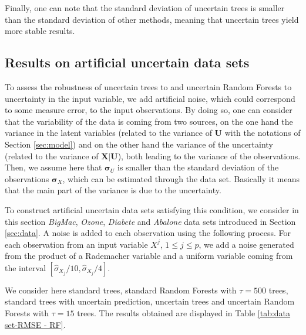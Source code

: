 Finally, one can note that the standard deviation of uncertain trees is smaller than the standard deviation of other methods, meaning that uncertain trees yield more stable results.

\subsection{Results on artificial uncertain data sets}
\label{sec:arti}
To assess the robustness of uncertain trees to and uncertain Random Forests to uncertainty in the input variable, we add artificial noise, which could correspond to some measure error, to the input observations.
By doing so, one can consider that the variability of the data is coming from two sources, on the one hand the variance in the latent variables (related to the variance of $\mathbf{U}$ with the notations of Section \ref{sec:model}) and on the other hand the variance of the uncertainty (related to the variance of $\mathbf{X} | \mathbf{U}$), both leading to the variance of the observations.
Then, we assume here that $\boldsymbol{\sigma}_U$ is smaller than  the standard deviation of the observations $\boldsymbol{\sigma}_X$, which can be estimated through the data set. Basically it means that the main part of the variance is due to the uncertainty.

To construct artificial uncertain data sets satisfying this condition, we consider in this section \textit{BigMac}, \textit{Ozone}, \textit{Diabete} and \textit{Abalone} data sets introduced in Section \ref{sec:data}.
A noise is added to each observation using the following process. For each observation from an input variable $X^j$, $1\leq j \leq p$, we add a noise generated from the product of a Rademacher variable and a uniform variable coming from the interval $[\hat{\sigma}_{X_j}/10, \hat{\sigma}_{X_j}/4]$.

We consider here standard trees, standard Random Forests with $\tau = 500$ trees, standard trees with uncertain prediction, uncertain trees and uncertain Random Forests with $\tau = 15$ trees. The results obtained are displayed in Table \ref{tab:data set-RMSE - RF}.

